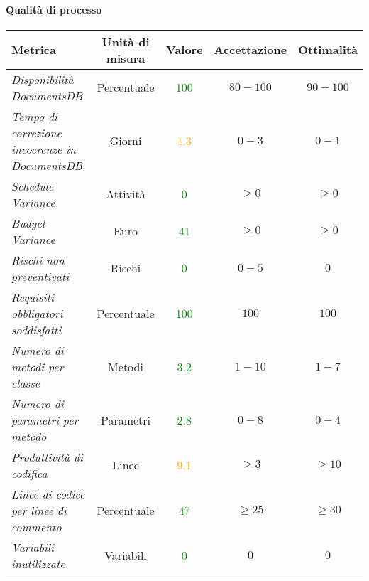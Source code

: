\paragraph{Qualità di processo}
\begin{longtable}{|>{\centering}m{5cm}|c|c|c|c|}
\hline
\textbf{Metrica} & \textbf{Unità di misura} & \textbf{Valore} & \textbf{Accettazione} & \textbf{Ottimalità}\\
\hline
\endhead
\emph{Disponibilità DocumentsDB} & {Percentuale} & \textcolor{Green}{100} & $80 - 100$ & $90 - 100$\\ \hline
\emph{Tempo di correzione incoerenze in DocumentsDB} & {Giorni} & \textcolor{Orange}{1.3} & $0 - 3$ & $0 - 1$\\ \hline
\emph{Schedule Variance} & {Attività} & \textcolor{Green}{0} & $\geq 0$  & $\geq 0$\\ \hline
\emph{Budget Variance} & {Euro} & \textcolor{Green}{41} & $\geq 0$ & $\geq 0$\\ \hline
\emph{Rischi non preventivati} & {Rischi} & \textcolor{Green}{0} & $0 - 5$ & $0$\\ \hline
\emph{Requisiti obbligatori soddisfatti} & {Percentuale} & \textcolor{Green}{100} & $100$ & $100$\\ \hline
\emph{Numero di metodi per classe} & {Metodi} & \textcolor{Green}{3.2} & $1 - 10$ & $1 - 7$\\ \hline
\emph{Numero di parametri per metodo} & {Parametri} & \textcolor{Green}{2.8} & $0 - 8$ & $0 - 4$\\ \hline
\emph{Produttività di codifica} & {Linee} & \textcolor{Orange}{9.1} & $\geq 3$ & $\geq 10$\\ \hline
\emph{Linee di codice per linee di commento} & {Percentuale} & \textcolor{Green}{47} & $\geq 25$ & $\geq 30$\\ \hline
\emph{Variabili inutilizzate} & {Variabili} & \textcolor{Green}{0} & $0$ & $0$\\ \hline

\end{longtable}
